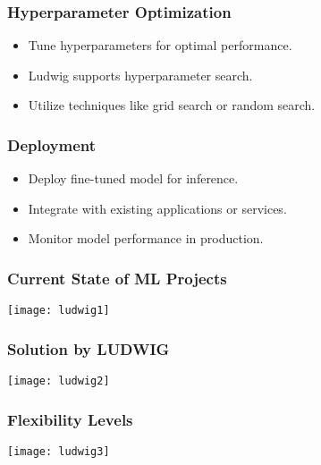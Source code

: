 \begin{frame}[fragile]\frametitle{Hyperparameter Optimization}
    \begin{itemize}
        \item Tune hyperparameters for optimal performance.
        \item Ludwig supports hyperparameter search.
        \item Utilize techniques like grid search or random search.
    \end{itemize}
\end{frame}

\begin{frame}[fragile]\frametitle{Deployment}
    \begin{itemize}
        \item Deploy fine-tuned model for inference.
        \item Integrate with existing applications or services.
        \item Monitor model performance in production.
    \end{itemize}
\end{frame}


\begin{frame}[fragile]\frametitle{Current State of ML Projects}


		\begin{center}
		\texttt{[image: ludwig1]}
		\end{center}

\end{frame}


\begin{frame}[fragile]\frametitle{Solution by LUDWIG}


		\begin{center}
		\texttt{[image: ludwig2]}
		\end{center}

\end{frame}

\begin{frame}[fragile]\frametitle{Flexibility Levels}


		\begin{center}
		\texttt{[image: ludwig3]}
		\end{center}

\end{frame}

